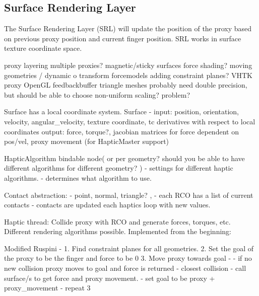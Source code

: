 \subsection{Surface Rendering Layer}
The Surface Rendering Layer (SRL) will update the position of the
proxy based on previous proxy position and current finger
position. SRL works in surface texture coordinate space.

proxy layering
multiple proxies?
magnetic/sticky surfaces
force shading?
moving geometries / dynamic o transform 
forcemodels adding constraint planes? VHTK proxy
OpenGL feedbackbuffer triangle meshes
probably need double precision, but should be able to choose
non-uniform scaling? problem?

Surface has a local coordinate system.
Surface - input: position, orientation, velocity, angular_velocity,
texture coordinate, tc derivatives with respect to local coordinates
         output: force, torque?, jacobian matrices for force dependent
         on pos/vel, proxy movement (for HapticMaster support)


HapticAlgorithm bindable node( or per geometry? should you be able to
have different algorithms for different geometry? )
- settings for different haptic algorithms.
- determines what algorithm to use.

Contact abstraction:
- point, normal, triangle? , 
- each RCO has a list of current contacts
- contacts are updated each haptics loop with new values.

Haptic thread:
Collide proxy with RCO and generate forces, torques, etc. Different
rendering algorithms possible. Implemented from the beginning:

Modified Ruspini - 
1. Find constraint planes for all geometries.
2. Set the goal of the proxy to be the finger and force to be 0
3. Move proxy towards goal - 
  - if no new collision proxy moves to goal and force is returned
  - closest collision - call surface/s to get force and proxy movement.
  - set goal to be proxy + proxy_movement 
  - repeat 3


 


